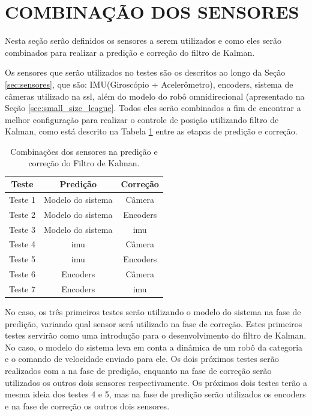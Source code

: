 \documentclass[acronym, symbols, table]{fei}
\begin{document}
	\section{COMBINAÇÃO DOS SENSORES}\label{sec_metodologia_comb_sensores}
	
		Nesta seção serão definidos os sensores a serem utilizados e como eles serão combinados para realizar a predição e correção do filtro de Kalman.
		
		Os sensores que serão utilizados no testes são os descritos ao longo da Seção \ref{sec:sensores}, que são: IMU(Giroscópio + Acelerômetro), encoders, sistema de câmeras utilizado na \acrshort{ssl}, além do modelo do robô omnidirecional (apresentado na Seção \ref{sec:small_size_league}. Todos eles serão combinados a fim de encontrar a melhor configuração para realizar o controle de posição utilizando filtro de Kalman, como está descrito na Tabela \ref{tbl:combinacao_sensores} entre as etapas de predição e correção.
		
		\begin{table}[!htb]
			\centering
			\caption{Combinações dos sensores na predição e correção do Filtro de Kalman.}
			\label{tbl:combinacao_sensores}
			\begin{tabular}{|c|c|c|}
				\hline
				\textbf{Teste}   & \textbf{Predição}   & \textbf{Correção} \\ \hline
				Teste 1 & Modelo do sistema & Câmera   \\ \hline
				Teste 2 & Modelo do sistema & Encoders \\ \hline
				Teste 3 & Modelo do sistema & \acrshort{imu} \\ \hline
				Teste 4 & \acrshort{imu}    & Câmera   \\ \hline
				Teste 5 & \acrshort{imu}    & Encoders \\ \hline
				Teste 6 & Encoders          & Câmera   \\ \hline
				Teste 7 & Encoders          & \acrshort{imu} \\ \hline
			\end{tabular}
		\end{table}
		
		No caso, os três primeiros testes serão utilizando o modelo do sistema na fase de predição, variando qual sensor será utilizado na fase de correção. Estes primeiros testes servirão como uma introdução para o desenvolvimento do filtro de Kalman. No caso, o modelo do sistema leva em conta a dinâmica de um robô da categoria  e o comando de velocidade enviado para ele. Os dois próximos testes serão realizados com a  na fase de predição, enquanto na fase de correção serão utilizados os outros dois sensores respectivamente. Os próximos dois testes terão a mesma ideia dos testes 4 e 5, mas na fase de predição serão utilizados os encoders e na fase de correção os outros dois sensores.
		
\end{document}

